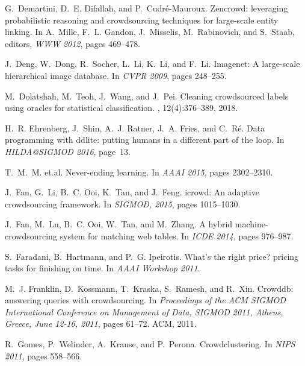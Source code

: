 \documentclass[11pt]{article}
\begin{document}
\begin{thebibliography}{10}
	G.~Demartini, D.~E. Difallah, and P.~Cudr{\'{e}}{-}Mauroux.
	\newblock Zencrowd: leveraging probabilistic reasoning and crowdsourcing
	techniques for large-scale entity linking.
	\newblock In A.~Mille, F.~L. Gandon, J.~Misselis, M.~Rabinovich, and S.~Staab,
	editors, {\em {WWW} 2012}, pages 469--478.
	
	J.~Deng, W.~Dong, R.~Socher, L.~Li, K.~Li, and F.~Li.
	\newblock Imagenet: {A} large-scale hierarchical image database.
	\newblock In {\em CVPR 2009}, pages 248--255.
	
	M.~Dolatshah, M.~Teoh, J.~Wang, and J.~Pei.
	\newblock Cleaning crowdsourced labels using oracles for statistical
	classification.
	, 12(4):376--389, 2018.
	
	H.~R. Ehrenberg, J.~Shin, A.~J. Ratner, J.~A. Fries, and C.~R{\'{e}}.
	\newblock Data programming with ddlite: putting humans in a different part of
	the loop.
	\newblock In {\em HILDA@SIGMOD 2016}, page~13.
	
	T.~M.~M. et.al.
	\newblock Never-ending learning.
	\newblock In {\em AAAI 2015}, pages 2302--2310.
	
	J.~Fan, G.~Li, B.~C. Ooi, K.~Tan, and J.~Feng.
	\newblock icrowd: An adaptive crowdsourcing framework.
	\newblock In {\em SIGMOD, 2015}, pages 1015--1030.
	
	J.~Fan, M.~Lu, B.~C. Ooi, W.~Tan, and M.~Zhang.
	\newblock A hybrid machine-crowdsourcing system for matching web tables.
	\newblock In {\em {ICDE} 2014}, pages 976--987.
	
	S.~Faradani, B.~Hartmann, and P.~G. Ipeirotis.
	\newblock What's the right price? pricing tasks for finishing on time.
	\newblock In {\em {AAAI} Workshop 2011}.
	
	M.~J. Franklin, D.~Kossmann, T.~Kraska, S.~Ramesh, and R.~Xin.
	\newblock Crowddb: answering queries with crowdsourcing.
	\newblock In {\em Proceedings of the {ACM} {SIGMOD} International Conference on
		Management of Data, {SIGMOD} 2011, Athens, Greece, June 12-16, 2011}, pages
	61--72. {ACM}, 2011.
	
	R.~Gomes, P.~Welinder, A.~Krause, and P.~Perona.
	\newblock Crowdclustering.
	\newblock In {\em NIPS 2011}, pages 558--566.
	

\end{thebibliography}
\end{document}
